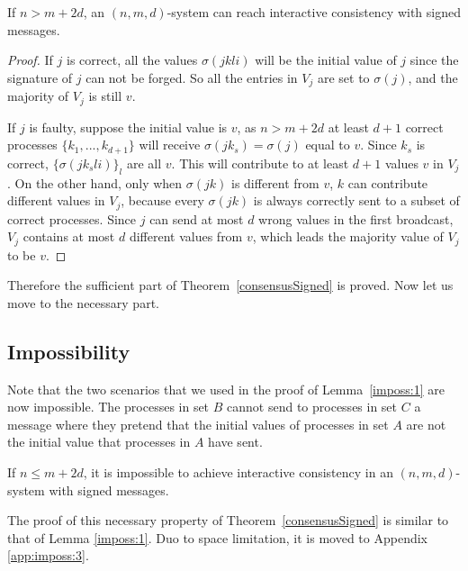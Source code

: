 \begin{lemma}
  If $n>m+2d$, an  $(n,m,d)$-system can reach interactive consistency with signed
  messages.
\end{lemma}

\begin{proof}
  If $j$ is correct, all the values $\sigma ( j k l i )$ will be the
  initial value of $j$ since the signature of $j$ can not be forged. So all the entries in $V_j$ are set to $\sigma (j)$, and the majority of $V_{j}$ is still $v$.
  
  If $j$ is faulty, suppose the initial value is $v$, as $n>m+2d$ at least $d+1$
  correct processes $\{k_1,...,k_{d+1}\}$ will receive $\sigma( j  k_{s}) = \sigma(j)$ equal to $v$. Since $k_s$ is correct, $\{\sigma(j k_s l i)\}_l$ are all $v$. This
  will contribute to at least $d+1$ values $v$ in $V_{j}$. On the other
  hand, only when $\sigma ( j k )$ is different from
  $v$, $k$ can contribute different values in $V_{j}$, because every $\sigma(j k)$ is always correctly sent to a subset of correct processes. Since $j$ can send at
  most $d$ wrong values in the first broadcast, $V_{j}$ contains at most $d$
  different values from $v$, which leads the majority value of $V_{j}$ to be
  $v$.
\end{proof}

Therefore the sufficient part of Theorem~\ref{consensusSigned} is proved. Now let us move to the necessary part.

\subsection{Impossibility}

Note that the two scenarios that we used in the proof of Lemma~\ref{imposs:1}
are now impossible. The processes in set $B$ cannot send to processes in set $C$ a message 
where they pretend that the initial values of processes in set $A$ are not the initial value that processes in $A$ have sent.

\begin{lemma}\label{imposs:3}
  If $n \leqslant m+2d$, it is impossible to achieve interactive consistency in an $(n,m,d)$-system with signed messages.
\end{lemma}


The proof of this necessary property of Theorem~\ref{consensusSigned} is similar to that of Lemma \ref{imposs:1}. Duo to space limitation, it is moved to Appendix \ref{app:imposs:3}.
